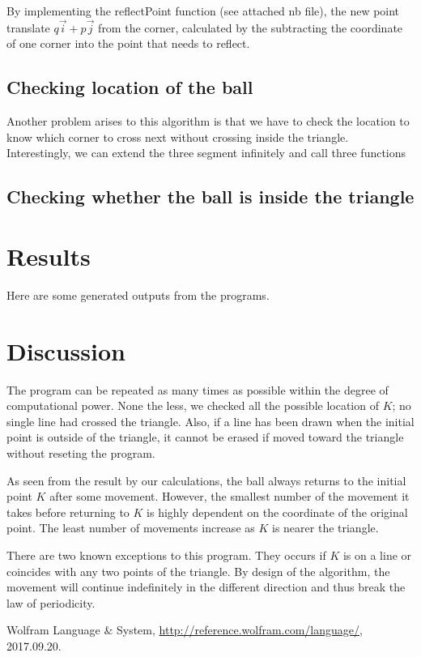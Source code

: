 \documentclass[11pt,a4paper]{article}
\begin{document}
By implementing the reflectPoint function (see attached nb file), the new point translate \(q\vec{i} + p\vec{j}\) from the corner, calculated by the subtracting the coordinate of one corner into the point that needs to reflect.

\subsection{Checking location of the ball}
Another problem arises to this algorithm is that we have to check the location to know which corner to cross next without crossing inside the triangle. Interestingly, we can extend the three segment infinitely and call three functions 

\subsection{Checking whether the ball is inside the triangle}


\section{Results}
Here are some generated outputs from the programs.

\section{Discussion}
The program can be repeated as many times as possible within the degree of computational power. None the less, we checked all the possible location of \(K\); no single line had crossed the triangle. Also, if a line has been drawn when the initial point is outside of the triangle, it cannot be erased if moved toward the triangle without reseting the program.

As seen from the result by our calculations, the ball always returns to the initial point \(K\) after some movement. However, the smallest number of the movement it takes before returning to \(K\) is highly dependent on the coordinate of the original point. The least number of movements increase as \(K\) is nearer the triangle. 

There are two known exceptions to this program. They occurs if \(K\) is on a line or coincides with any two points of the triangle. By design of the algorithm, the movement will continue indefinitely in the different direction and thus break the law of periodicity.

\begin{thebibliography}{99}

 Wolfram Language \& System, \url{http://reference.wolfram.com/language/}, 2017.09.20.


\end{thebibliography}
\end{document}
